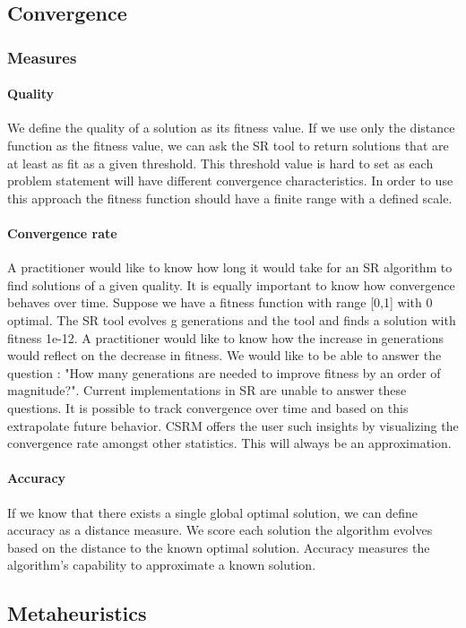 \subsection{Convergence}
\subsubsection{Measures}
\paragraph{Quality}
We define the quality of a solution as its fitness value. If we use only the distance function as the fitness value, we can ask the SR tool to return solutions that are at least as fit as a given threshold. This threshold value is hard to set as each problem statement will have different convergence characteristics. In order to use this approach the fitness function should have a finite range with a defined scale. 
\paragraph{Convergence rate}
A practitioner would like to know how long it would take for an SR algorithm to find solutions of a given quality. It is equally important to know how convergence behaves over time. Suppose we have a fitness function with range [0,1] with 0 optimal. The SR tool evolves g generations and the tool and finds a solution with fitness 1e-12. A practitioner would like to know how the increase in generations would reflect on the decrease in fitness. We would like to be able to answer the question : "How many generations are needed to improve fitness by an order of magnitude?". Current implementations in SR are unable to answer these questions. It is possible to track convergence over time and based on this extrapolate future behavior. CSRM offers the user such insights by visualizing the convergence rate amongst other statistics. This will always be an approximation.

\paragraph{Accuracy}
If we know that there exists a single global optimal solution, we can define accuracy as a distance measure. We score each solution the algorithm evolves based on the distance to the known optimal solution. Accuracy measures the algorithm's capability to approximate a known solution. 

\subsection{Metaheuristics}

